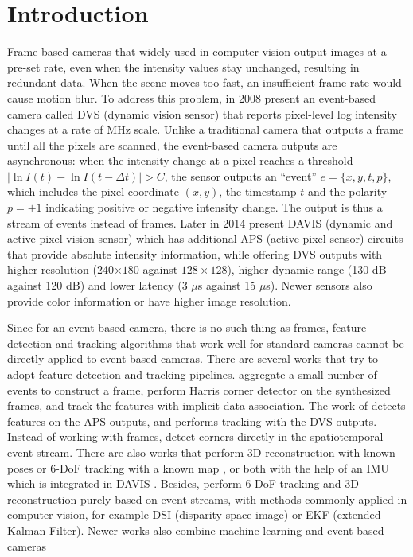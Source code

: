 \chapter{Introduction}
\label{sec:introduction}

Frame-based cameras that widely used in computer vision output images
at a pre-set rate, even when the intensity values stay unchanged,
resulting in redundant data. When the scene moves too fast, an
insufficient frame rate would cause motion blur. To address this
problem, in 2008 \citet{lichtsteiner2008128} present an event-based
camera called DVS (dynamic vision sensor) that reports pixel-level log
intensity changes at a rate of \unit{MHz} scale. Unlike a traditional
camera that outputs a frame until all the pixels are scanned, the
event-based camera outputs are asynchronous: when the intensity change
at a pixel reaches a threshold
$\mid\ln{I(t)}-\ln{I(t-\Delta t)}\mid>C$, the sensor outputs an
``event'' $e=\{x,y,t,p\}$, which includes the pixel coordinate
$(x, y)$, the timestamp $t$ and the polarity $p=\pm1$ indicating
positive or negative intensity change. The output is thus a stream of
events instead of frames. Later in 2014 \citet{brandli2014240} present
DAVIS (dynamic and active pixel vision sensor) which has additional
APS (active pixel sensor) circuits that provide absolute intensity
information, while offering DVS outputs with higher resolution
(240$\times180$ against $128\times128$), higher dynamic range (130 dB
against 120 dB) and lower latency (3 $\mu$s against 15 $\mu$s). Newer
sensors also provide color
information\citep{li2015design,moeys2018sensitive} or have higher
image resolution\citep{son20174}.

Since for an event-based camera, there is no such thing as frames,
feature detection and tracking algorithms that work well for standard
cameras cannot be directly applied to event-based cameras. There are
several works that try to adopt feature detection and tracking
pipelines. \citet{zhu2017event} aggregate a small number of events to
construct a frame, perform Harris corner detector
\citep{harris1988combined} on the synthesized frames, and track the
features with implicit data association. The work of
\citet{tedaldi2016feature} detects features on the APS outputs, and
performs tracking with the DVS outputs. Instead of working with
frames, \citet{mueggler2017fast} detect corners directly in the
spatiotemporal event stream. There are also works that perform 3D
reconstruction with known poses \citep{rebecq2016emvs} or 6-DoF
tracking with a known map \citep{gallego2017event}, or both with the
help of an IMU which is integrated in DAVIS
\citep{rebecq2017real}. Besides, \citep{kim2016real,rebecq2017evo}
perform 6-DoF tracking and 3D reconstruction purely based on event
streams, with methods commonly applied in computer vision, for example
DSI (disparity space image) or EKF (extended Kalman Filter). Newer
works also combine machine learning and event-based cameras
\citep{orchard2015hfirst,maqueda2018event,zhu2018ev}

